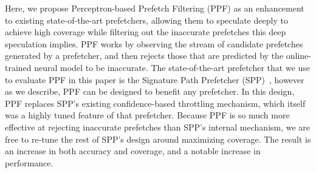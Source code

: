 

Here, we propose Perceptron-based Prefetch Filtering (PPF) as an
enhancement to existing state-of-the-art prefetchers, allowing them to
speculate deeply to achieve high coverage while filtering out the
inaccurate prefetches this deep speculation implies.  PPF works by
observing the stream of candidate prefetches generated by a
prefetcher, and then rejects those that are predicted by the
online-trained neural model to be inaccurate.  The state-of-the-art
prefetcher that we use to evaluate PPF in this paper is the Signature
Path Prefetcher (SPP)~\cite{SPP}, however as we describe, PPF can be
designed to benefit any prefetcher.  In this design, PPF replaces
SPP's existing confidence-based throttling mechanism, which itself was
a highly tuned feature of that prefetcher.  Because PPF is so much
more effective at rejecting inaccurate prefetches than SPP's 
{\color{red}internal} mechanism, we are free to re-tune the rest of 
SPP's design around maximizing coverage. The result is an increase 
in both accuracy and coverage, and a notable increase in performance.

